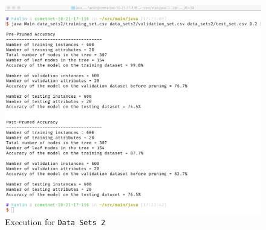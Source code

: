 \documentclass[12pt, letterpaper]{article}
\begin{document}
\begin{figure}
\includegraphics[width=\textwidth]{dataset2.png}
\caption{Execution for \texttt{Data Sets 2}}\label{s2}
\end{figure}
\end{document}
